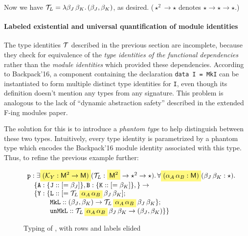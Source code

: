 \documentclass{article}
\begin{document}
\noindent
Now we have $\mathcal{T}_L = \lambda \beta_J\, \beta_K.\, (\beta_J, \beta_K)$, as desired.
($\star^2 \rightarrow \star$ denotes $\star \rightarrow \star \rightarrow \star$.)

\paragraph{Labeled existential and universal quantification of module
identities}
The type identities $\mathcal{T}$ described in the previous section are
incomplete, because they check for equivalence of the \emph{type
identities of the functional dependencies} rather than the \emph{module
identities} which provided these dependencies.  According to
Backpack'16, a component containing the declaration \verb|data I = MkI|
can be instantiated to form multiple distinct
type identities for \verb|I|, even though its definition doesn't mention
any types from any signature.  This problem is analogous to the
lack of ``dynamic abstraction safety'' described in the extended
F-ing modules paper.

The solution for this is to introduce a \emph{phantom type} to
help distinguish between these two types.  Intuitively, every type
identity is parametrized by a phantom type which encodes the
Backpack'16 module identity associated with this type.  Thus,
to refine the previous example further:

\begin{figure}[H]
\[
\begin{array}{l}
\cidl{p} : \exists \highlight{(\CK_Y : \KM^2 \rightarrow \KM)} (\CT_L : \highlight{\KM^2} \rightarrow \star^2 \rightarrow \star).\, \forall \highlight{(\alpha_A\, \alpha_B : \KM)} (\beta_J\, \beta_K : \star).\, \\
    \quad \{
     \modname{A} :
        \{ \mathtt{J} :: [ = \beta_J ] \},
     \modname{B} :
        \{ \mathtt{K} :: [ = \beta_K ] \},
    \}
    \rightarrow \\
    \quad \{
     \modname{Y} :
        \{ \mathtt{L} :: [ = \CT_L\,\highlight{\alpha_A\, \alpha_B}\, \beta_J\, \beta_K ]; \\
        \qquad\quad~ \mathtt{MkL} :: (\beta_J, \beta_K) \rightarrow \CT_L\,\highlight{\alpha_A\, \alpha_B}\, \beta_J\, \beta_K \}; \\
        \qquad\quad~ \mathtt{unMkL} :: \CT_L\, \highlight{\alpha_A\, \alpha_B}\, \beta_J\, \beta_K \rightarrow (\beta_J, \beta_K)  \}
    \}
\end{array}
\]
\caption{Typing of , with rows and labels elided}
\end{figure}
\end{document}
